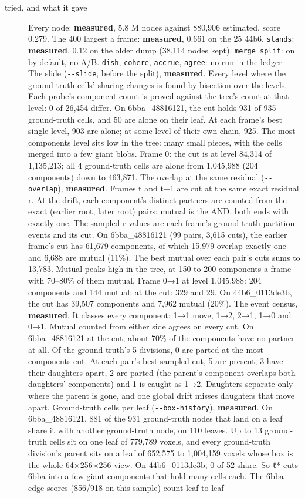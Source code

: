 \begin{description}
\item[{tried, and what it gave}] Every node: \textbf{measured}, 5.8 M nodes against 880,906 estimated, score 0.279. The 400 largest a frame: \textbf{measured}, 0.661 on the 25 44b6. \texttt{stands}: \textbf{measured}, 0.12 on the older dump (38,114 nodes kept). \texttt{merge\_\allowbreak{}split}: on by default, no A/B. \texttt{dish}, \texttt{cohere}, \texttt{accrue}, \texttt{agree}: no run in the ledger. The slide (\texttt{-\allowbreak{}-\allowbreak{}slide}, before the split), \textbf{measured}. Every level where the ground-truth cells' sharing changes is found by bisection over the levels. Each probe's component count is proved against the tree's count at that level: 0 of 26,454 differ. On 6bba\_\allowbreak{}48816121, the cut holds 931 of 935 ground-truth cells, and 50 are alone on their leaf. At each frame's best single level, 903 are alone; at some level of their own chain, 925. The most-components level sits low in the tree: many small pieces, with the cells merged into a few giant blobs. Frame 0: the cut is at level 84,314 of 1,135,213; all 4 ground-truth cells are alone from 1,045,988 (204 components) down to 463,871. The overlap at the same residual (\texttt{-\allowbreak{}-\allowbreak{}overlap}), \textbf{measured}. Frames t and t+1 are cut at the same exact residual r. At the drift, each component's distinct partners are counted from the exact (earlier root, later root) pairs; mutual is the AND, both ends with exactly one. The sampled r values are each frame's ground-truth partition events and its cut. On 6bba\_\allowbreak{}48816121 (99 pairs, 3,615 cuts), the earlier frame's cut has 61,679 components, of which 15,979 overlap exactly one and 6,688 are mutual (11\%). The best mutual over each pair's cuts sums to 13,783. Mutual peaks high in the tree, at 150 to 200 components a frame with 70–80\% of them mutual. Frame 0→1 at level 1,045,988: 204 components and 144 mutual; at the cut: 329 and 29. On 44b6\_\allowbreak{}0113de3b, the cut has 39,507 components and 7,962 mutual (20\%). The event census, \textbf{measured}. It classes every component: 1→1 move, 1→2, 2→1, 1→0 and 0→1. Mutual counted from either side agrees on every cut. On 6bba\_\allowbreak{}48816121 at the cut, about 70\% of the components have no partner at all. Of the ground truth's 5 divisions, 0 are parted at the most-components cut. At each pair's best sampled cut, 5 are present, 3 have their daughters apart, 2 are parted (the parent's component overlaps both daughters' components) and 1 is caught as 1→2. Daughters separate only where the parent is gone, and one global drift misses daughters that move apart. Ground-truth cells per leaf (\texttt{-\allowbreak{}-\allowbreak{}box-\allowbreak{}history}), \textbf{measured}. On 6bba\_\allowbreak{}48816121, 881 of the 931 ground-truth nodes that land on a leaf share it with another ground-truth node, on 110 leaves. Up to 13 ground-truth cells sit on one leaf of 779,789 voxels, and every ground-truth division's parent sits on a leaf of 652,575 to 1,004,159 voxels whose box is the whole 64×256×256 view. On 44b6\_\allowbreak{}0113de3b, 0 of 52 share. So ℓ* cuts 6bba into a few giant components that hold many cells each. The 6bba edge scores (856/918 on this sample) count leaf-to-leaf 
\end{description}
